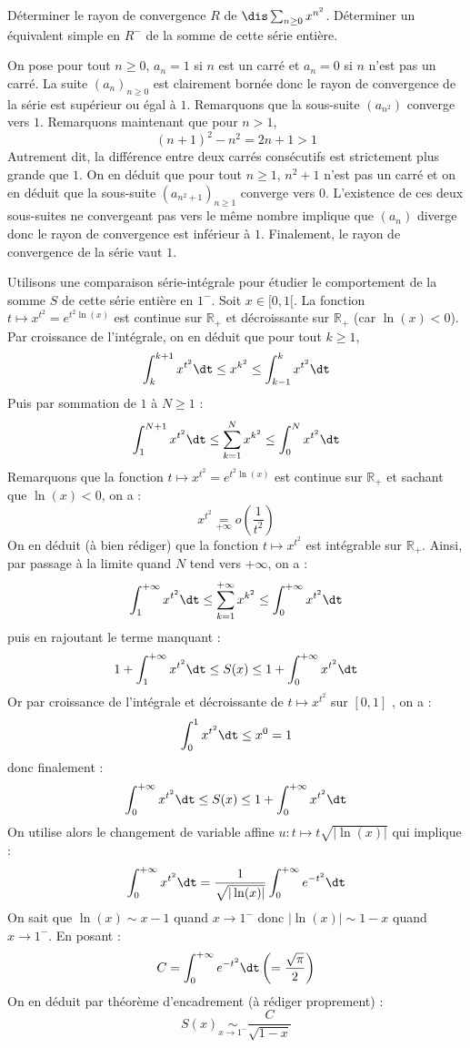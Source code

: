 \documentclass[a4paper,10pt]{report}
\begin{document}
\begin{Exa} Déterminer le rayon de convergence $R$ de $\dis \sum_{n \geq 0} x^{n^2}$. Déterminer un équivalent simple en $R^{-}$ de la somme de cette série entière.
\end{Exa}

\begin{corr} On pose pour tout $n \geq 0$, $a_n=1$ si $n$ est un carré et $a_n =0$ si $n$ n'est pas un carré. La suite $(a_n)_{n \geq 0}$ est clairement bornée donc le rayon de convergence de la série est supérieur ou égal à $1$. Remarquons que la sous-suite $(a_{n^2})$ converge vers $1$. Remarquons maintenant que pour $n>1$,
$$ (n+1)^2-n^2 = 2n+1>1$$
Autrement dit, la différence entre deux carrés consécutifs est strictement plus grande que $1$. On en déduit que pour tout $n \geq 1$, $n^2+1$ n'est pas un carré et on en déduit que la sous-suite $(a_{n^2+1})_{n \geq 1}$ converge vers $0$. L'existence de ces deux sous-suites ne convergeant pas vers le même nombre implique que $(a_n)$ diverge donc le rayon de convergence est inférieur à $1$. Finalement, le rayon de convergence de la série vaut $1$.

\medskip

\noindent Utilisons une comparaison série-intégrale pour étudier le comportement de la somme $S$ de cette série entière en $1^{-}$. Soit $x \in [0,1[$. La fonction $t \mapsto x^{t^2} = e^{t^2 \ln(x)}$ est continue sur $\mathbb{R}_+$ et décroissante sur $\mathbb{R}_+$ (car $\ln(x)<0$). Par croissance de l'intégrale, on en déduit que pour tout $k \geq 1$,
$$ \int_{k}^{k+1} x^{t^2} \dt \leq x^{k^2} \leq \int_{k-1}^{k} x^{t^2} \dt$$
Puis par sommation de $1$ à $N \geq 1$ :
$$ \int_{1}^{N+1} x^{t^2} \dt \leq \sum_{k=1}^N x^{k^2} \leq \int_{0}^{N} x^{t^2} \dt$$
Remarquons que la fonction $t \mapsto x^{t^2} = e^{t^2 \ln(x)}$ est continue sur $\mathbb{R}_+$ et sachant que $\ln(x)<0$, on a :
$$ x^{t^2} \underset{+ \infty}{=} o \left( \dfrac{1}{t^2} \right)$$
On en déduit (à bien rédiger) que la fonction $t \mapsto x^{t^2}$ est intégrable sur $\mathbb{R}_+$. Ainsi, par passage à la limite quand $N$ tend vers $+ \infty$, on a :
$$  \int_{1}^{+ \infty} x^{t^2} \dt \leq \sum_{k=1}^{+ \infty} x^{k^2} \leq \int_{0}^{+ \infty} x^{t^2} \dt$$
puis en rajoutant le terme manquant :
$$ 1+  \int_{1}^{+ \infty} x^{t^2} \dt \leq S(x) \leq 1+ \int_{0}^{+ \infty} x^{t^2} \dt$$
Or par croissance de l'intégrale et décroissante de $t \mapsto x^{t^2}$ sur $[0,1]$ , on a :
$$ \int_{0}^{1} x^{t^2} \dt \leq x^{0} =1$$
donc finalement :
$$\int_{0}^{+ \infty} x^{t^2} \dt \leq S(x) \leq 1+ \int_{0}^{+ \infty} x^{t^2} \dt$$
On utilise alors le changement de variable affine  $u : t \mapsto t \sqrt{\vert \ln(x) \vert}$ qui implique :
$$ \int_{0}^{+ \infty} x^{t^2} \dt = \dfrac{1}{\sqrt{\vert \ln(x) \vert}} \int_{0}^{+ \infty} e^{-t^2} \dt$$
On sait que $\ln(x) \sim x-1$ quand $x \rightarrow 1^{-}$ donc $\vert \ln(x) \vert \sim 1-x$ quand $x \rightarrow 1^{-}$. En posant :
$$ C =  \int_{0}^{+ \infty} e^{-t^2} \dt \left( = \dfrac{\sqrt{\pi}}{2} \right)$$
On en déduit par théorème d'encadrement (à rédiger proprement) :
$$S(x) \underset{x \rightarrow 1^{-}}{\sim} \dfrac{C}{\sqrt{1-x}}$$
\end{corr}
\end{document}
